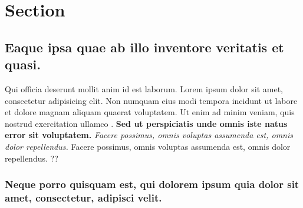 \label{chapter-1}

\section{Section}\label{section-1.1}

\subsection{Eaque ipsa quae ab illo inventore veritatis et
quasi.}\label{eaque-ipsa-quae-ab-illo-inventore-veritatis-et-quasi.}

Qui officia deserunt mollit anim id est laborum. Lorem ipsum dolor sit
amet, consectetur adipisicing elit. Non numquam eius modi tempora
incidunt ut labore et dolore magnam aliquam quaerat voluptatem. Ut enim
ad minim veniam, quis nostrud exercitation ullamco
\citep{Zongkerchicken2005}. \textbf{Sed ut perspiciatis unde omnis iste
natus error sit voluptatem.} \emph{Facere possimus, omnis voluptas
assumenda est, omnis dolor repellendus.} Facere possimus, omnis voluptas
assumenda est, omnis dolor repellendus. ??\citep{upper1974unsuccessful}



\subsubsection{Neque porro quisquam est, qui dolorem ipsum quia dolor
sit amet, consectetur, adipisci
velit.}\label{neque-porro-quisquam-est-qui-dolorem-ipsum-quia-dolor-sit-amet-consectetur-adipisci-velit.}

